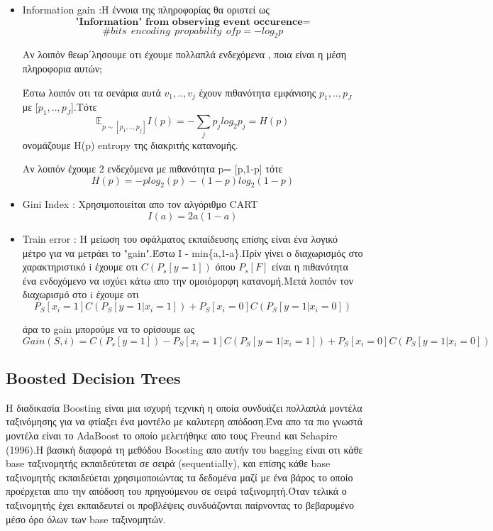 \documentclass[12pt,a4paper]{article}
\begin{document}
\begin{itemize}
\item Information gain :Η έννοια της πληροφορίας θα οριστεί ως
$$\textbf{"Information" \ \ from \ \ observing  \ \  event   \ \ occurence}=$$
$$ \# bits \ \ encoding\ \ propability \ \ of p = -log_2p$$

Αν λοιπόν θεωρ΄λησουμε οτι έχουμε πολλαπλά ενδεχόμενα , ποια είναι η μέση πληροφορια αυτών;
\par Έστω λοιπόν οτι τα σενάρια αυτά $v_1,..,v_j$  έχουν πιθανότητα εμφάνισης
$p_1,..,p_J$ με [$p_1,..,p_J$].Τότε
$$\mathbb{E}_{p\sim[p_1,..,p_j]} I(p) = -\sum_jp_j log_2 p_j = H(p)$$
ονομάζουμε H(p) entropy της διακριτής κατανομής.
\par Αν λοιπόν έχουμε 2 ενδεχόμενα με πιθανότητα p= [p,1-p] τότε
$$H(p) = -plog_2(p) - (1-p)log_2 (1-p)$$

\item Gini Index : Χρησιμοποιείται απο τον αλγόριθμο CART $$I(a) = 2a(1-a)$$



\item Train error : Η μείωση του σφάλματος εκπαίδευσης επίσης είναι ένα λογικό μέτρο για να μετράει το "gain".Έστω I - min\{a,1-a\}.Πρίν γίνει ο διαχωρισμός στο χαρακτηριστικό i έχουμε οτι $C(P_s[y=1])$ όπου $P_s[F]$ είναι η πιθανότητα ένα ενδοχόμενο να ισχύει κάτω απο την ομοιόμορφη κατανομή.Μετά λοιπόν τον διαχωρισμό στο i έχουμε οτι $$P_S[x_i=1]C(P_S[y=1|x_i=1])+P_S[x_i=0]C(P_S[y=1|x_i=0])$$

άρα το gain μπορούμε να το ορίσουμε ως
$$Gain(S,i) = C(P_s[y=1]) -P_S[x_i=1]C(P_S[y=1|x_i=1])+P_S[x_i=0]C(P_S[y=1|x_i=0]) $$
\end{itemize}





\subsection{Boosted Decision Trees}

Η διαδικασία Boosting είναι μια ισχυρή τεχνική η οποία συνδυάζει πολλαπλά μοντέλα ταξινόμησης για να φτίαξει ένα μοντέλο με καλυτερη απόδοση.Ένα απο τα πιο γνωστά μοντέλα είναι το AdaBoost το οποίο μελετήθηκε απο τους Freund και Schapire (1996).H βασική διαφορά τη μεθόδου Boosting απο αυτήν του bagging είναι οτι κάθε base ταξινομητής εκπαιδεύτεται σε σειρά  (sequentially), και επίσης κάθε base ταξινομητής εκπαιδεύεται χρησιμοποιώντας τα δεδομένα μαζί με ένα βάρος το οποίο προέρχεται απο την απόδοση του πρηγούμενου σε σειρά ταξινομητή.Όταν τελικά ο ταξινομητής έχει εκπαιδευτεί οι προβλέψεις συνδυάζονται παίρνοντας το βεβαρυμένο μέσο όρο όλων των base ταξινομητών.
\end{document}
